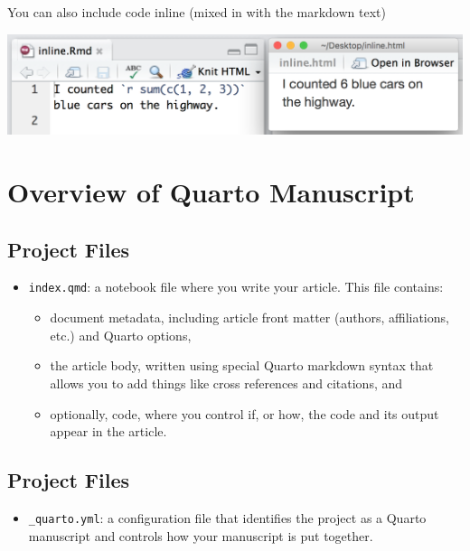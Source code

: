 \documentclass[
  letterpaper,
  DIV=11,
  numbers=noendperiod]{scrartcl}
\providecommand{\tightlist}{%
  \setlength{\itemsep}{0pt}\setlength{\parskip}{0pt}}\usepackage{longtable,booktabs,array}
\begin{document}
You can also include code inline (mixed in with the markdown text)

\includegraphics{img/inlinecode_ex.png}

\section{Overview of Quarto
Manuscript}\label{overview-of-quarto-manuscript}

\subsection{Project Files}\label{project-files}

\begin{itemize}
\tightlist
\item
  \texttt{index.qmd}: a notebook file where you write your article. This
  file contains:

  \begin{itemize}
  \tightlist
  \item
    document metadata, including article front matter (authors,
    affiliations, etc.) and Quarto options,
  \item
    the article body, written using special Quarto markdown syntax that
    allows you to add things like cross references and citations, and
  \item
    optionally, code, where you control if, or how, the code and its
    output appear in the article.
  \end{itemize}
\end{itemize}

\subsection{Project Files}\label{project-files-1}

\begin{itemize}
\tightlist
\item
  \texttt{\_quarto.yml}: a configuration file that identifies the
  project as a Quarto manuscript and controls how your manuscript is put
  together.
\end{itemize}
\end{document}
